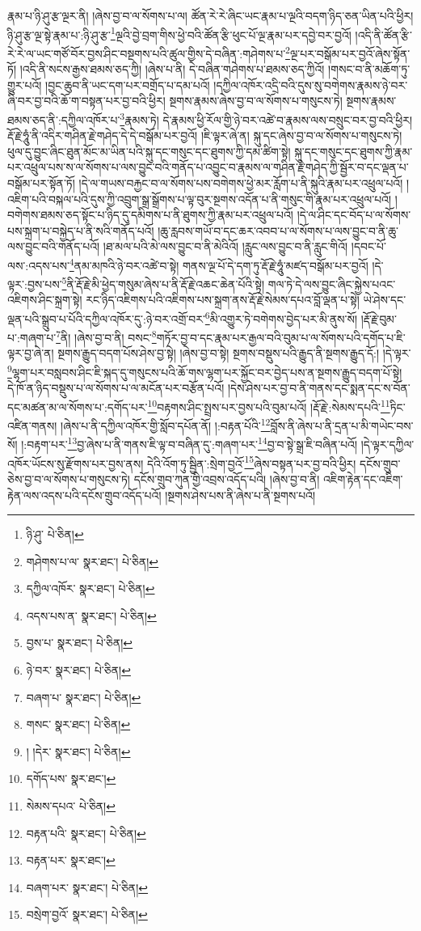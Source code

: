 རྣམ་པ་ཉི་ཤུ་རྩ་ལྔར་ནི། །ཞེས་བྱ་བ་ལ་སོགས་པ་ལ། ཚོན་རེ་རེ་ཞིང་ཡང་རྣམ་པ་ལྔའི་བདག་ཉིད་ཅན་ཡིན་པའི་ཕྱིར། ཉི་ཤུ་རྩ་ལྔ་སྟེ་རྣམ་པ་:ཉི་ཤུ་རྩ་\footnote{ཉི་ཤུ་  པེ་ཅིན། }ལྔའི་བྱེ་བྲག་གིས་ཕྱེ་བའི་ཚོན་རྩི་ཕུང་པོ་ལྔ་རྣམ་པར་དབྱེ་བར་བྱའོ། །འདི་ནི་ཚོན་རྩི་རེ་རེ་ལ་ཡང་གཙོ་བོར་བྱས་ཤིང་བསྔགས་པའི་ཚུལ་གྱིས་དེ་བཞིན་:གཤེགས་པ་\footnote{གཤེགས་པ་ལ་  སྣར་ཐང་།  པེ་ཅིན། }ལྔ་པར་བསྒོམ་པར་བྱའོ་ཞེས་སྟོན་ཏོ། །འདི་ནི་སངས་རྒྱས་ཐམས་ཅད་ཀྱི། །ཞེས་པ་ནི། དེ་བཞིན་གཤེགས་པ་ཐམས་ཅད་ཀྱིའོ། །གསང་བ་ནི་མཆོག་ཏུ་གྱུར་པའོ། །བྱང་ཆུབ་ནི་ཡང་དག་པར་བགྲོད་པ་དམ་པའོ། །དཀྱིལ་འཁོར་འདྲི་བའི་དུས་སུ་བགེགས་རྣམས་ཉེ་བར་ཞི་བར་བྱ་བའི་ཆོ་ག་བསྟན་པར་བྱ་བའི་ཕྱིར། སྔགས་རྣམས་ཞེས་བྱ་བ་ལ་སོགས་པ་གསུངས་ཏེ། སྔགས་རྣམས་ཐམས་ཅད་ནི་:དཀྱིལ་འཁོར་པ་\footnote{དཀྱིལ་འཁོར་  སྣར་ཐང་།  པེ་ཅིན། }རྣམས་ཏེ། དེ་རྣམས་ཕྱི་རོལ་གྱི་ཉེ་བར་འཚེ་བ་རྣམས་ལས་བསྲུང་བར་བྱ་བའི་ཕྱིར། རྡོ་རྗེ་ཧཱུཾ་ནི་འདིར་གཤིན་རྗེ་གཤེད་དེ་དེ་བསྒོམ་པར་བྱའོ། །ཇི་ལྟར་ཞེ་ན། སྐུ་དང་ཞེས་བྱ་བ་ལ་སོགས་པ་གསུངས་ཏེ། ཕུལ་དུ་བྱུང་ཞིང་ཐུན་མོང་མ་ཡིན་པའི་སྐུ་དང་གསུང་དང་ཐུགས་ཀྱི་དམ་ཚིག་སྟེ། སྐུ་དང་གསུང་དང་ཐུགས་ཀྱི་རྣམ་པར་འཕྲུལ་པས་ས་ལ་སོགས་པ་ལས་བྱུང་བའི་གནོད་པ་འབྱུང་བ་རྣམས་ལ་གཤིན་རྗེ་གཤེད་ཀྱི་སྦྱོར་བ་དང་ལྡན་པ་བསྒོམ་པར་སྟོན་ཏོ། །དེ་ལ་གཡས་བརྐྱང་བ་ལ་སོགས་པས་བགེགས་ཕྱེ་མར་རློག་པ་ནི་སྐུའི་རྣམ་པར་འཕྲུལ་པའོ། །འཇིག་པའི་བསྐལ་པའི་དུས་ཀྱི་འབྲུག་སྒྲ་སྒྲོགས་པ་ལྟ་བུར་སྔགས་འདོན་པ་ནི་གསུང་གི་རྣམ་པར་འཕྲུལ་པའོ། །བགེགས་ཐམས་ཅད་སྟོང་པ་ཉིད་དུ་དམིགས་པ་ནི་ཐུགས་ཀྱི་རྣམ་པར་འཕྲུལ་པའོ། །དེ་ལ་ཤིང་དང་བོད་པ་ལ་སོགས་པས་སྐྲག་པ་བསྐྱེད་པ་ནི་སའི་གནོད་པའོ། །ཆུ་རླབས་གཡོ་བ་དང་ཆར་འབབ་པ་ལ་སོགས་པ་ལས་བྱུང་བ་ནི་ཆུ་ལས་བྱུང་བའི་གནོད་པའོ། །ཐ་མལ་པའི་མེ་ལས་བྱུང་བ་ནི་མེའིའོ། །རླུང་ལས་བྱུང་བ་ནི་རླུང་གིའོ། །དབང་པོ་ལས་:འདས་པས་\footnote{འདས་པས་ན་  སྣར་ཐང་།  པེ་ཅིན། }ནམ་མཁའི་ཉེ་བར་འཚེ་བ་སྟེ། གནས་ལྔ་པོ་དེ་དག་ཏུ་རྡོ་རྗེ་ཧཱུཾ་མཛད་བསྒོམ་པར་བྱའོ། །དེ་ལྟར་:བྱས་པས་\footnote{བྱས་པ་  སྣར་ཐང་།  པེ་ཅིན། }ནི་རྡོ་རྗེ་མི་ཕྱེད་གསུམ་ཞེས་པ་ནི་རྡོ་རྗེ་འཆང་ཆེན་པོའི་སྟེ། གལ་ཏེ་དེ་ལས་བྱུང་ཞིང་སྐྱེས་པའང་འཇིགས་ཤིང་སྐྲག་སྟེ། རང་ཉིད་འཇིགས་པའི་འཇིགས་པས་སྐྲག་ནས་རྡོ་རྗེ་སེམས་དཔའ་བློ་ལྡན་པ་སྟེ། ཡེ་ཤེས་དང་ལྡན་པའི་སྒྲུབ་པ་པོའི་དཀྱིལ་འཁོར་དུ་:ཉེ་བར་འགྲོ་བར་\footnote{ཉེ་བར་  སྣར་ཐང་།  པེ་ཅིན། }མི་འགྱུར་ཏེ་བགེགས་བྱེད་པར་མི་ནུས་སོ། །རྡོ་རྗེ་བུམ་པ་:གཞག་པ་\footnote{བཞག་པ་  སྣར་ཐང་།  པེ་ཅིན། }ནི། །ཞེས་བྱ་བ་ནི། བསང་\footnote{གསང་  སྣར་ཐང་།  པེ་ཅིན། }གཏོར་བྱ་བ་དང་རྣམ་པར་རྒྱལ་བའི་བུམ་པ་ལ་སོགས་པའི་དགོད་པ་ཇི་ལྟར་བྱ་ཞེ་ན། སྔགས་རྒྱུད་བདག་པོས་ཤེས་བྱ་སྟེ། །ཞེས་བྱ་བ་སྟེ། སྔགས་བསྡུས་པའི་རྒྱུད་ནི་སྔགས་རྒྱུད་དོ:། །དེ་ལྟར་\footnote{། །དེར་  སྣར་ཐང་།  པེ་ཅིན། }ལྷག་པར་བསླབས་ཤིང་ཇི་སྐད་དུ་གསུངས་པའི་ཆོ་གས་ལྷག་པར་སྐྱོང་བར་བྱེད་པས་ན་སྔགས་རྒྱུད་བདག་པོ་སྟེ། དེ་ཁོ་ན་ཉིད་བསྡུས་པ་ལ་སོགས་པ་ལ་མངོན་པར་བརྩོན་པའོ། །དེས་ཤེས་པར་བྱ་བ་ནི་གནས་དང་སྨན་དང་ས་བོན་དང་མཚན་མ་ལ་སོགས་པ་:དགོད་པར་\footnote{དགོད་པས་  སྣར་ཐང་། }བརྟགས་ཤིང་སྤྲས་པར་བྱས་པའི་བུམ་པའོ། །རྡོ་རྗེ་:སེམས་དཔའི་\footnote{སེམས་དཔའ་  པེ་ཅིན། }ཏིང་འཛིན་གནས། །ཞེས་པ་ནི་དཀྱིལ་འཁོར་གྱི་སློབ་དཔོན་ནོ། །:བརྟན་པོའི་\footnote{བརྟན་པའི་  སྣར་ཐང་།  པེ་ཅིན། }བློས་ནི་ཞེས་པ་ནི་དྲན་པ་མི་གཡེང་བས་སོ། །:བརྟག་པར་\footnote{བརྟན་པར་  སྣར་ཐང་། }བྱ་ཞེས་པ་ནི་གནས་ཇི་ལྟ་བ་བཞིན་དུ་:གཞག་པར་\footnote{བཞག་པར་  སྣར་ཐང་།  པེ་ཅིན། }བྱ་བ་སྟེ་སྒྲ་ཇི་བཞིན་པའོ། །དེ་ལྟར་དཀྱིལ་འཁོར་ཡོངས་སུ་རྫོགས་པར་བྱས་ནས། དེའི་འོག་ཏུ་སྦྱིན་:སྲེག་བྱའོ་\footnote{བསྲེག་བྱའོ་  སྣར་ཐང་།  པེ་ཅིན། }ཞེས་བསྟན་པར་བྱ་བའི་ཕྱིར། དངོས་གྲུབ་ཅེས་བྱ་བ་ལ་སོགས་པ་གསུངས་ཏེ། དངོས་གྲུབ་ཀུན་གྱི་འབྲས་འདོད་པའི། །ཞེས་བྱ་བ་ནི། འཇིག་རྟེན་དང་འཇིག་རྟེན་ལས་འདས་པའི་དངོས་གྲུབ་འདོད་པའོ། །སྔགས་ཤེས་པས་ནི་ཞེས་པ་ནི་སྔགས་པའོ། 
